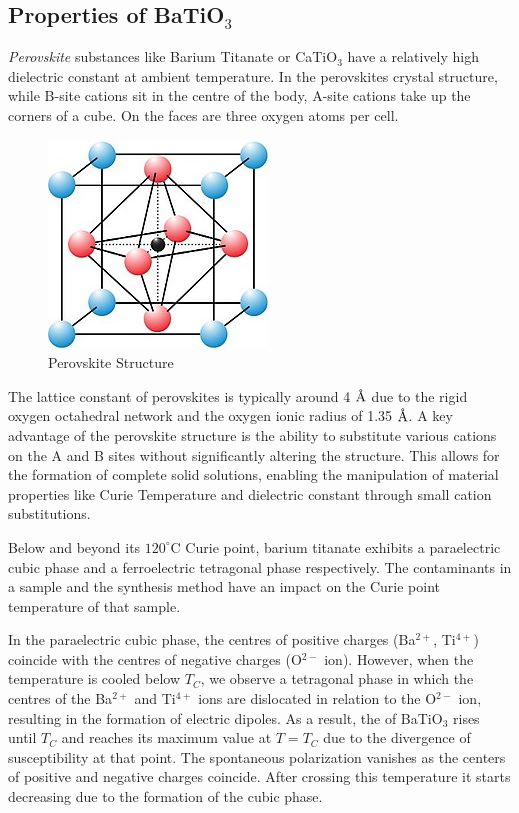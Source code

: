 \subsection{Properties of BaTiO$_3$}

	\textit{Perovskite} substances like Barium Titanate or CaTiO$_3$ have a relatively high dielectric constant at ambient temperature. In the perovskites crystal structure, while B-site cations sit in the centre of the body, A-site cations take up the corners of a cube. On the faces are three oxygen atoms per cell.

	\begin{figure}[H]
		\centering
		\label{fig:2}
		\includegraphics[width=0.4\columnwidth]{images/t3.jpg}
		\caption{Perovskite Structure}
	\end{figure}

	The lattice constant of perovskites is typically around 4 $\textup{\AA}$ due to the rigid oxygen octahedral network and the oxygen ionic radius of 1.35 $\textup{\AA}$. A key advantage of the perovskite structure is the ability to substitute various cations on the A and B sites without significantly altering the structure. This allows for the formation of complete solid solutions, enabling the manipulation of material properties like Curie Temperature and dielectric constant through small cation substitutions.

	Below and beyond its $120^\circ$C Curie point, barium titanate exhibits a paraelectric cubic phase and a ferroelectric tetragonal phase respectively. The contaminants in a sample and the synthesis method have an impact on the Curie point temperature of that sample. 
	
	In the paraelectric cubic phase, the centres of positive charges (Ba$^{2+}$, Ti$^{4+}$) coincide with the centres of negative charges (O$^{2-}$ ion). However, when the temperature is cooled below $T_C$, we observe a tetragonal phase in which the centres of the Ba$^{2+}$ and Ti$^{4+}$ ions are dislocated in relation to the O$^{2-}$ ion, resulting in the formation of electric dipoles. As a result, the of BaTiO$_3$ rises until $T_C$ and reaches its maximum value at $T = T_C$ due to the divergence of susceptibility at that point. The spontaneous polarization vanishes as the centers of positive and
	negative charges coincide. After crossing this temperature it starts decreasing due to the formation of the cubic phase.

